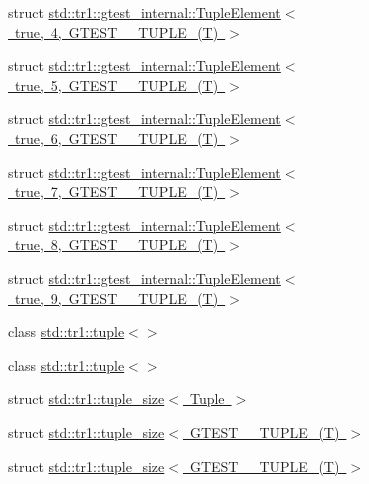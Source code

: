\begin{DoxyCompactItemize}
struct \mbox{\hyperlink{structstd_1_1tr1_1_1gtest__internal_1_1_tuple_element_3_01true_00_014_00_01_g_t_e_s_t__10___t_u_p_l_e___07_t_08_01_4}{std\+::tr1\+::gtest\+\_\+internal\+::\+Tuple\+Element$<$ true, 4, G\+T\+E\+S\+T\+\_\+\_\+\+T\+U\+P\+L\+E\+\_\+(\+T) $>$}}
\item 
struct \mbox{\hyperlink{structstd_1_1tr1_1_1gtest__internal_1_1_tuple_element_3_01true_00_015_00_01_g_t_e_s_t__10___t_u_p_l_e___07_t_08_01_4}{std\+::tr1\+::gtest\+\_\+internal\+::\+Tuple\+Element$<$ true, 5, G\+T\+E\+S\+T\+\_\+\_\+\+T\+U\+P\+L\+E\+\_\+(\+T) $>$}}
\item 
struct \mbox{\hyperlink{structstd_1_1tr1_1_1gtest__internal_1_1_tuple_element_3_01true_00_016_00_01_g_t_e_s_t__10___t_u_p_l_e___07_t_08_01_4}{std\+::tr1\+::gtest\+\_\+internal\+::\+Tuple\+Element$<$ true, 6, G\+T\+E\+S\+T\+\_\+\_\+\+T\+U\+P\+L\+E\+\_\+(\+T) $>$}}
\item 
struct \mbox{\hyperlink{structstd_1_1tr1_1_1gtest__internal_1_1_tuple_element_3_01true_00_017_00_01_g_t_e_s_t__10___t_u_p_l_e___07_t_08_01_4}{std\+::tr1\+::gtest\+\_\+internal\+::\+Tuple\+Element$<$ true, 7, G\+T\+E\+S\+T\+\_\+\_\+\+T\+U\+P\+L\+E\+\_\+(\+T) $>$}}
\item 
struct \mbox{\hyperlink{structstd_1_1tr1_1_1gtest__internal_1_1_tuple_element_3_01true_00_018_00_01_g_t_e_s_t__10___t_u_p_l_e___07_t_08_01_4}{std\+::tr1\+::gtest\+\_\+internal\+::\+Tuple\+Element$<$ true, 8, G\+T\+E\+S\+T\+\_\+\_\+\+T\+U\+P\+L\+E\+\_\+(\+T) $>$}}
\item 
struct \mbox{\hyperlink{structstd_1_1tr1_1_1gtest__internal_1_1_tuple_element_3_01true_00_019_00_01_g_t_e_s_t__10___t_u_p_l_e___07_t_08_01_4}{std\+::tr1\+::gtest\+\_\+internal\+::\+Tuple\+Element$<$ true, 9, G\+T\+E\+S\+T\+\_\+\_\+\+T\+U\+P\+L\+E\+\_\+(\+T) $>$}}
\item 
class \mbox{\hyperlink{classstd_1_1tr1_1_1tuple_3_4}{std\+::tr1\+::tuple$<$$>$}}
\item 
class \mbox{\hyperlink{classstd_1_1tr1_1_1tuple}{std\+::tr1\+::tuple$<$$>$}}
\item 
struct \mbox{\hyperlink{structstd_1_1tr1_1_1tuple__size}{std\+::tr1\+::tuple\+\_\+size$<$ Tuple $>$}}
\item 
struct \mbox{\hyperlink{structstd_1_1tr1_1_1tuple__size_3_01_g_t_e_s_t__0___t_u_p_l_e___07_t_08_01_4}{std\+::tr1\+::tuple\+\_\+size$<$ G\+T\+E\+S\+T\+\_\+\_\+\+T\+U\+P\+L\+E\+\_\+(\+T) $>$}}
\item 
struct \mbox{\hyperlink{structstd_1_1tr1_1_1tuple__size_3_01_g_t_e_s_t__1___t_u_p_l_e___07_t_08_01_4}{std\+::tr1\+::tuple\+\_\+size$<$ G\+T\+E\+S\+T\+\_\+\_\+\+T\+U\+P\+L\+E\+\_\+(\+T) $>$}}

\end{DoxyCompactItemize}
